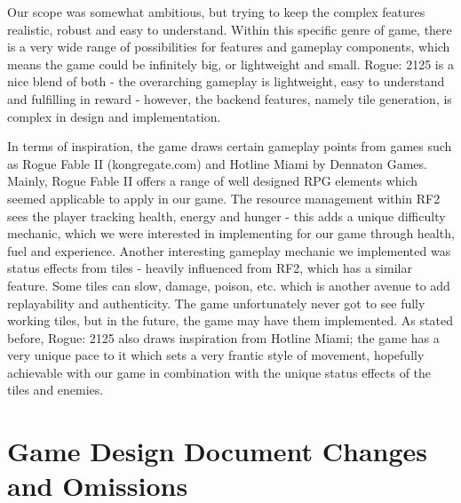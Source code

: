 \documentclass[12pt]{article}
\begin{document}
Our scope was somewhat ambitious, but trying to keep the complex features realistic, robust and easy to understand. Within this specific genre of game, there is a very wide range of possibilities for features and gameplay components, which means the game could be infinitely big, or lightweight and small. Rogue: 2125 is a nice blend of both - the overarching gameplay is lightweight, easy to understand and fulfilling in reward - however, the backend features, namely tile generation, is complex in design and implementation. \linebreak

In terms of inspiration, the game draws certain gameplay points from games such as Rogue Fable II (kongregate.com) and Hotline Miami by Dennaton Games. Mainly, Rogue Fable II offers a range of well designed RPG elements which seemed applicable to apply in our game. The resource management within RF2 sees the player tracking health, energy and hunger - this adds a unique difficulty mechanic, which we were interested in implementing for our game through health, fuel and experience. Another interesting gameplay mechanic we implemented was status effects from tiles - heavily influenced from RF2, which has a similar feature. Some tiles can slow, damage, poison, etc. which is another avenue to add replayability and authenticity. The game unfortunately never got to see fully working tiles, but in the future, the game may have them implemented. As stated before, Rogue: 2125 also draws inspiration from Hotline Miami; the game has a very unique pace to it which sets a very frantic style of movement, hopefully achievable with our game in combination with the unique status effects of the tiles and enemies.

\vfill

\section{Game Design Document Changes and Omissions}
\end{document}
